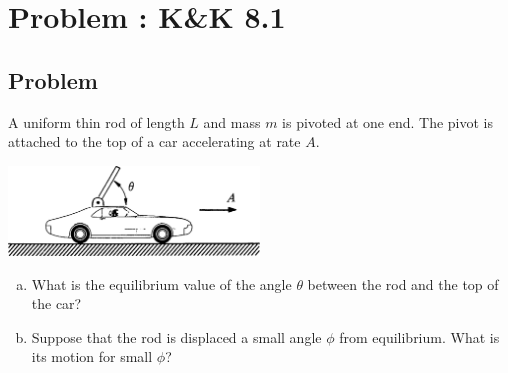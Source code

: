 \documentclass[solutions]{esg8012pset}
\begin{document}
\section{Problem \thesection: K\&K 8.1}
\subsection{Problem}
  A uniform thin rod of length $L$ and mass $m$ is pivoted at one end. The pivot is attached to the top of a car accelerating at rate $A$.
  \begin{center}\includegraphics[width=0.5\textwidth]{ps11_3}\end{center}
  \begin{enumerate}[(a)]
    \item What is the equilibrium value of the angle $\theta$ between the rod and the top of the car?
    \item Suppose that the rod is displaced a small angle $\phi$ from equilibrium. What is its motion for small $\phi$?
  \end{enumerate}
\end{document}

